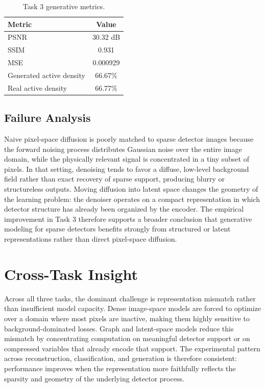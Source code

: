 \documentclass[11pt]{article}
\begin{document}
\begin{table}[H]
\centering
\small
\caption{Task 3 generative metrics.}
\begin{tabular}{lc}
\toprule
\textbf{Metric} & \textbf{Value} \\
\midrule
PSNR & 30.32 dB \\
SSIM & 0.931 \\
MSE & 0.000929 \\
Generated active density & 66.67\% \\
Real active density & 66.77\% \\
\bottomrule
\end{tabular}
\label{tab:task3_results}
\end{table}

\subsection{Failure Analysis}
Naive pixel-space diffusion is poorly matched to sparse detector images because the forward noising process distributes Gaussian noise over the entire image domain, while the physically relevant signal is concentrated in a tiny subset of pixels. In that setting, denoising tends to favor a diffuse, low-level background field rather than exact recovery of sparse support, producing blurry or structureless outputs. Moving diffusion into latent space changes the geometry of the learning problem: the denoiser operates on a compact representation in which detector structure has already been organized by the encoder. The empirical improvement in Task 3 therefore supports a broader conclusion that generative modeling for sparse detectors benefits strongly from structured or latent representations rather than direct pixel-space diffusion.

\section{Cross-Task Insight}
Across all three tasks, the dominant challenge is representation mismatch rather than insufficient model capacity. Dense image-space models are forced to optimize over a domain where most pixels are inactive, making them highly sensitive to background-dominated losses. Graph and latent-space models reduce this mismatch by concentrating computation on meaningful detector support or on compressed variables that already encode that support. The experimental pattern across reconstruction, classification, and generation is therefore consistent: performance improves when the representation more faithfully reflects the sparsity and geometry of the underlying detector process.
\end{document}
